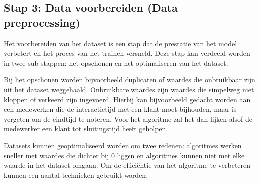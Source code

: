 
\subsection{Stap 3: Data voorbereiden (Data preprocessing)}\label{subsec:data-voorbereiden}
Het voorbereiden van het dataset is een stap dat de prestatie van het model verbetert en het proces van het trainen versneld. Deze stap kan verdeeld worden in twee sub-stappen: het opschonen en het optimaliseren van het dataset.

Bij het opschonen worden bijvoorbeeld duplicaten of waardes die onbruikbaar zijn uit het dataset weggehaald. Onbruikbare waardes zijn waardes die simpelweg niet kloppen of verkeerd zijn ingevoerd. Hierbij kan bijvoorbeeld gedacht worden aan een medewerken die de interactietijd met een klant moet bijhouden, maar is vergeten om de eindtijd te noteren. Voor het algoritme zal het dan lijken alsof de medewerker een klant tot sluitingstijd heeft geholpen.

Datasets kunnen geoptimaliseerd worden om twee redenen: algoritmes werken sneller met waardes die dichter bij \(0\) liggen en algoritmes kunnen niet met elke waarde in het dataset omgaan. Om de efficiëntie van het algoritme te verbeteren kunnen een aantal technieken gebruikt worden:

